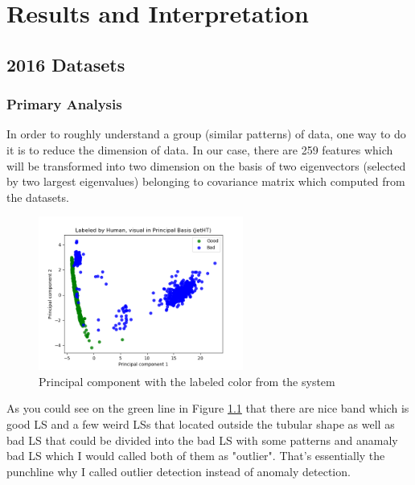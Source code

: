 \chapter{Results and Interpretation}

\section{2016 Datasets}

\subsection{Primary Analysis}
In order to roughly understand a group (similar patterns) of data, one way to do it is to reduce the dimension of data. In our case, there are 259 features which will be transformed into two dimension on the basis of two eigenvectors (selected by two largest eigenvalues) belonging to covariance matrix which computed from the datasets.
\begin{figure}[h!]
    \centering
    \includegraphics[width=0.6\textwidth]{images/reco/2016/JetHT_label_2016.png}
    \caption{Principal component with the labeled color from the system}
    \label{fig:JetHT_label_2016}
\end{figure}

As you could see on the green line in Figure \ref{fig:JetHT_label_2016} that there are nice band which is good LS and a few weird LSs that located outside the tubular shape as well as bad LS that could be divided into the bad LS with some patterns and anamaly bad LS which I would called both of them as "outlier". That's essentially the punchline why I called outlier detection instead of anomaly detection.

